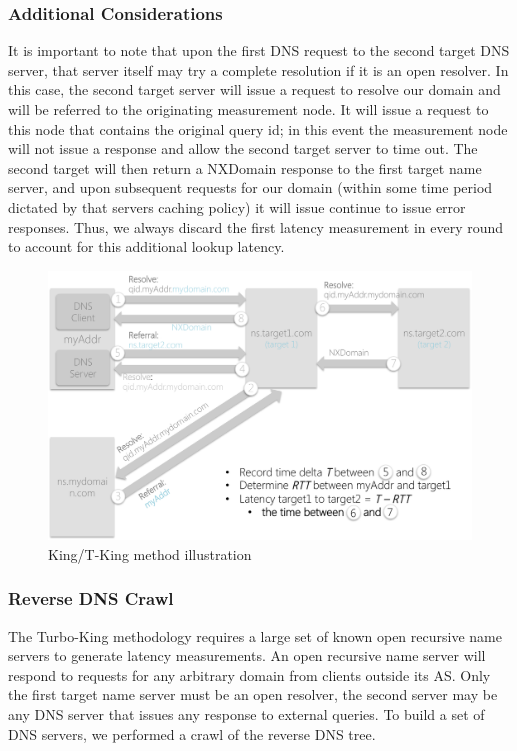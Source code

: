 \subsubsection{Additional Considerations}
It is important to note that upon the first DNS request to the second target DNS server, that server itself may try a complete resolution if it is an open resolver. In this case, the second target server will issue a request to resolve our domain and will be referred to the originating measurement node. It will issue a request to this node that contains the original query id; in this event the measurement node will not issue a response and allow the second target server to time out. The second target will then return a NXDomain response to the first target name server, and upon subsequent requests for our domain (within some time period dictated by that servers caching policy) it will issue continue to issue error responses. Thus, we always discard the first latency measurement in every round to account for this additional lookup latency.

\begin{figure}
  \centering
  \includegraphics[width=\linewidth]{../figs/king_model.pdf}
  \vspace{-1em}
  \caption{King/T-King method illustration}
  \label{fig:king_model}
\end{figure}

\subsubsection{Reverse DNS Crawl}
The Turbo-King methodology requires a large set of known open recursive name servers to generate latency measurements. An open recursive name server will respond to requests for any arbitrary domain from clients outside its AS. Only the first target name server must be an open resolver, the second server may be any DNS server that issues any response to external queries. To build a set of DNS servers, we performed a crawl of the reverse DNS tree.

